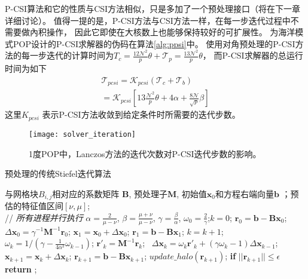 P-CSI算法和它的性质与CSI方法相似，只是多加了一个预处理接口（将在下一章详细讨论）。 
值得一提的是，P-CSI方法与CSI方法一样，在每一步迭代过程中不需要做內积操作， 因此它即使在大核数上也能够保持较好的可扩展性。
为海洋模式POP设计的P-CSI求解器的伪码在算法\ref{alg:ppsi}中。
使用对角预处理的P-CSI方法的每一步迭代的计算时间为$T_c =\frac{12\mathcal{N}^2}{p}\theta+\mathcal{T}_p =\frac{13\mathcal{N}^2}{p}\theta$， 
而P-CSI求解器的总运行时间为如下
\begin{eqnarray}
\label{t_psi}
\mathcal{T}_{pcsi} = \mathcal{K}_{pcsi}(\mathcal{T}_c + \mathcal{T}_b ) \nonumber \\
= \mathcal{K}_{pcsi}[13\frac{\mathcal{N}^2}{p}\theta+ 4\alpha + \frac{8\mathcal{N}}{ \sqrt{p}}\beta]
\end{eqnarray}
这里$K_{pcsi}$ 表示P-CSI方法收敛到给定条件时所需要的迭代步数。 
\begin {figure}[!t]
\begin{center}
\texttt{[image: solver\_iteration]}
\caption []{1度POP中，Lanczos方法的迭代次数对P-CSI迭代步数的影响。 \label{fig:iter}}
\end{center}
\end {figure}

\begin{algorithm}[!t]
\caption{ 预处理的传统Stiefel迭代算法}
\label{alg:ppsi}
\begin{algorithmic}[1]
\REQUIRE 与网格块$B_{i,j}$相对应的系数矩阵 $\textbf{B}$, 预处理子$\textbf{M}$, 初始值$\textbf{x}_0$和方程右端向量$\textbf{b}$ ；预估的特征值区间$[\nu,\mu]$;  \\
 // \qquad    \textit{所有进程并行执行}
\STATE $\alpha =\frac{2}{\mu -\nu}$, $ \beta = \frac{\mu +\nu}{\mu -\nu}$, $\gamma = \frac{\beta}{\alpha}$, $\omega_0 =\frac{ 2}{\gamma}$;\quad $k = 0$;
\STATE $\textbf{r}_0 = \textbf{b}-\textbf{B}\textbf{x}_0$; $\Delta \textbf{x}_{0} = \gamma^{-1}\textbf{M}^{-1}\textbf{r}_0$; $\textbf{x}_1 =\textbf{x}_0 +\Delta \textbf{x}_{0}$; $\textbf{r}_1 =\textbf{b} -\textbf{B}\textbf{x}_1$;
\STATE $k=k+1$;
\STATE $\omega_k = 1/(\gamma - \frac{1}{4\alpha^2}\omega_{k-1})$; 
\STATE $\textbf{r}'_{k} =\textbf{M}^{-1}\textbf{r}_{k}$;  \
\STATE $\Delta \textbf{x}_{k} =\omega_k\textbf{r}'_{k}+(\gamma \omega_k-1)\Delta \textbf{x}_{k-1}$;
\STATE $\textbf{x}_{k+1} =\textbf{x}_{k}+\Delta \textbf{x}_{k}$;
\STATE $\textbf{r}_{k+1} =\textbf{b}- \textbf{B}\textbf{x}_{k+1}$; 
\STATE $update\_halo(\textbf{r}_{k+1})$; \COMMENT{边界通信}
\STATE \textbf{if} $||\textbf{r}_{k+1}|| \le \epsilon$  \textbf{return} ;
\ENDIF
\ENDWHILE
\end{algorithmic}
\end{algorithm}

